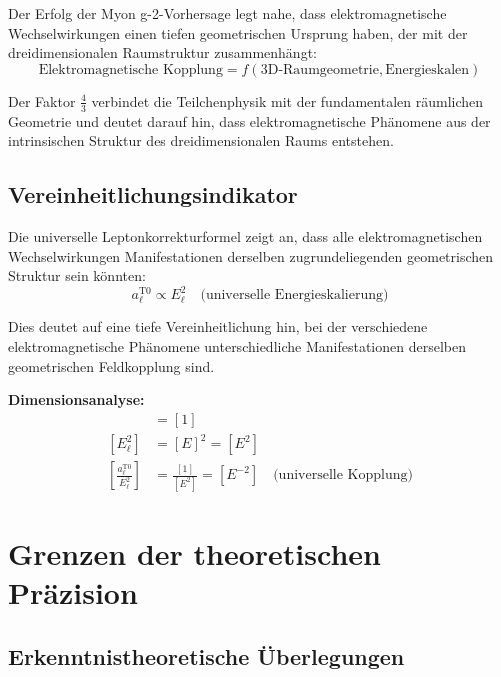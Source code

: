 \documentclass[12pt,a4paper]{report}
\begin{document}
	Der Erfolg der Myon g-2-Vorhersage legt nahe, dass elektromagnetische Wechselwirkungen einen tiefen geometrischen Ursprung haben, der mit der dreidimensionalen Raumstruktur zusammenhängt:
	\begin{equation}
		\text{Elektromagnetische Kopplung} = f(\text{3D-Raumgeometrie}, \text{Energieskalen})
	\end{equation}
	
	Der Faktor $\frac{4}{3}$ verbindet die Teilchenphysik mit der fundamentalen räumlichen Geometrie und deutet darauf hin, dass elektromagnetische Phänomene aus der intrinsischen Struktur des dreidimensionalen Raums entstehen.
	
	\subsection{Vereinheitlichungsindikator}
	\label{subsec:unification_indicator}
	
	Die universelle Leptonkorrekturformel zeigt an, dass alle elektromagnetischen Wechselwirkungen Manifestationen derselben zugrundeliegenden geometrischen Struktur sein könnten:
	\begin{equation}
		a_\ell^{\text{T0}} \propto E_\ell^2 \quad \text{(universelle Energieskalierung)}
	\end{equation}
	
	Dies deutet auf eine tiefe Vereinheitlichung hin, bei der verschiedene elektromagnetische Phänomene unterschiedliche Manifestationen derselben geometrischen Feldkopplung sind.
	
	\textbf{Dimensionsanalyse:}
	\begin{align}
		[a_\ell^{\text{T0}}] &= [1] \\
		[E_\ell^2] &= [E]^2 = [E^2] \\
		\left[\frac{a_\ell^{\text{T0}}}{E_\ell^2}\right] &= \frac{[1]}{[E^2]} = [E^{-2}] \quad \text{(universelle Kopplung)}
	\end{align}
	
	\section{Grenzen der theoretischen Präzision}
	\label{sec:limits_precision}
	
	\subsection{Erkenntnistheoretische Überlegungen}
	\label{subsec:epistemological_considerations}
	
\end{document}
